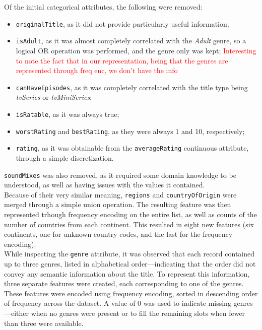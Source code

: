 Of the initial categorical attributes, the following were removed:
\begin{itemize}
    \item \texttt{originalTitle}, as it did not provide particularly useful
    information;
    \item \texttt{isAdult}, as it was almost completely correlated with the
    \textit{Adult} genre, so a logical OR operation was performed, and the genre
    only was kept;
    \textcolor{red}{Interesting to note the fact that in our representation, being that
        the genres are represented through freq enc, we don't have the info}
    \item \texttt{canHaveEpisodes}, as it was completely correlated with the title type
    being \textit{tvSeries} or \textit{tvMiniSeries};
    \item \texttt{isRatable}, as it was always true;
    \item \texttt{worstRating} and \texttt{bestRating}, as they were always
    1 and 10, respectively;
    \item \texttt{rating}, as it was obtainable from the \texttt{averageRating}
    continuous attribute, through a simple discretization.
\end{itemize}

\texttt{soundMixes} was also removed, as it required some domain knowledge to be
understood, as well as having issues with the values it contained.\\
Because of their very similar meaning, \texttt{regions} and \texttt{countryOfOrigin}
were merged through a simple union operation. The resulting feature was then
represented trhough frequency encoding on the entire list, as well as
counts of the number of countries from each continent.
This resulted in eight new features (six continents, one for unknown country codes,
and the last for the frequency encoding).\\
While inspecting the \texttt{genre} attribute, it was observed that each record
contained up to three genres, listed in alphabetical order—indicating that the order
did not convey any semantic information about the title.
To represent this information, three separate features were created, each
corresponding to one of the genres. These features were encoded using frequency
encoding, sorted in descending order of frequency across the dataset.  
A value of 0 was used to indicate missing genres—either when no genres were present or
to fill the remaining slots when fewer than three were available.\\


